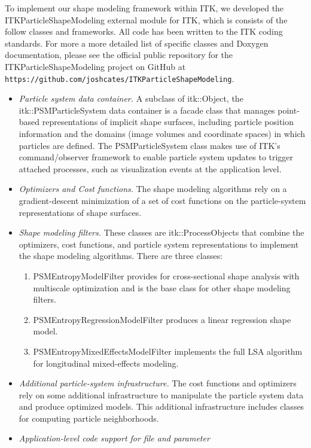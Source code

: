 \documentclass[11pt]{article}
\begin{document}
To implement our shape modeling framework within ITK, we developed the
ITKParticleShapeModeling external module for ITK, which is consists of
the follow classes and frameworks.  All code has been written to the
ITK coding standards.  For more a more detailed list of
specific classes and Doxygen documentation, please see the official
public repository for the ITKParticleShapeModeling project on GitHub
at \texttt{https://github.com/joshcates/ITKParticleShapeModeling}.
\begin{itemize}
\item {\em Particle system data container.}  A subclass of
  itk::Object, the itk::PSMParticleSystem data container is a facade
  class that manages point-based representations of implicit shape
  surfaces, including particle position information and the domains
  (image volumes and coordinate spaces) in which particles are
  defined.  The PSMParticleSystem class makes use of ITK's
  command/observer framework to enable particle system updates to
  trigger attached processes, such as visualization events at the
  application level.
\item{\em Optimizers and Cost functions.}  The shape modeling
  algorithms rely on a gradient-descent minimization of a set of cost
  functions on the particle-system representations of shape surfaces.
\item{\em Shape modeling filters.} These classes are itk::ProcessObjects that
  combine the optimizers, cost functions, and particle system representations
  to implement the shape modeling algorithms.  There are three
  classes:
  \begin{enumerate}
  \item PSMEntropyModelFilter provides for cross-sectional
    shape analysis with multiscale optimization and is the base class
    for other shape modeling filters.
  \item PSMEntropyRegressionModelFilter produces a linear
    regression shape model.
  \item PSMEntropyMixedEffectsModelFilter implements the full LSA
    algorithm for longitudinal mixed-effects modeling.
  \end{enumerate}
\item{\em Additional particle-system infrastructure.}  The cost functions
  and optimizers rely on some additional infrastructure to
  manipulate the particle system data and produce optimized models.  This
  additional infrastructure includes classes for computing particle
  neighborhoods.
\item{\em Application-level code support for file and parameter
}
\end{itemize}
\end{document}
